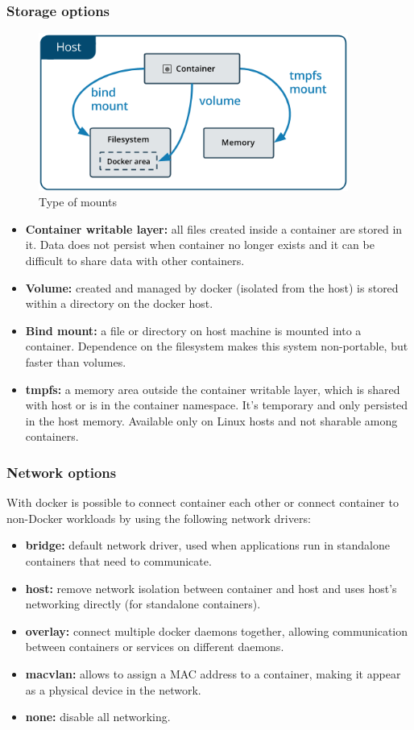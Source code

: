 \documentclass{article}
\begin{document}
\subsubsection{Storage options}
\begin{figure}[H]
    \centering
    \includegraphics[width=4in]{imgs/types-of-mounts.png}
    \caption{Type of mounts}
    \label{fig:typeofmounts}
\end{figure}
\begin{itemize}
    \item \textbf{Container writable layer:} all files created inside a container are stored in it. Data does not persist when container no longer exists and it can be difficult to share data with other containers.
    \item \textbf{Volume:} created and managed by docker (isolated from the host) is stored within a directory on the docker host.
    \item \textbf{Bind mount:} a file or directory on host machine is mounted into a container. Dependence on the filesystem makes this system non-portable, but faster than volumes.
    \item \textbf{tmpfs:} a memory area outside the container writable layer, which is shared with host or is in the container namespace. It's temporary and only persisted in the host memory. Available only on Linux hosts and not sharable among containers.
\end{itemize}
\subsubsection{Network options}
With docker is possible to connect container each other or connect container to non-Docker workloads by using the following network drivers:
\begin{itemize}
    \item \textbf{bridge:} default network driver, used when applications run in standalone containers that need to communicate.
    \item \textbf{host:} remove network isolation between container and host and uses host's networking directly (for standalone containers).
    \item \textbf{overlay:} connect multiple docker daemons together, allowing communication between containers or services on different daemons.
    \item \textbf{macvlan:} allows to assign a MAC address to a container, making it appear as a physical device in the network.
    \item \textbf{none:} disable all networking.
\end{itemize}
\end{document}
